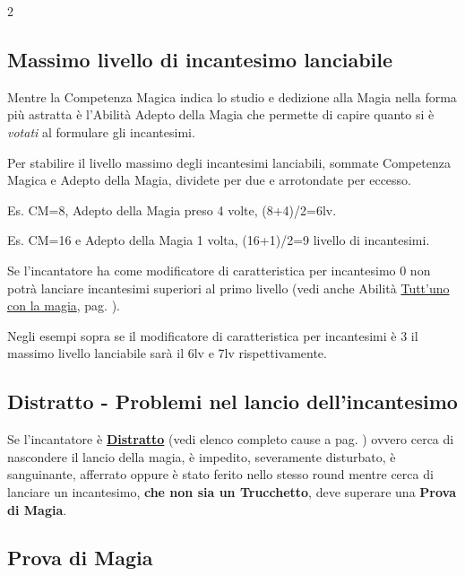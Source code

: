 \begin{multicols}{2}
\subsection{Massimo livello di incantesimo lanciabile}\hypertarget{scuoleelivelli}{}\label{magieaccessoallelistedimagia}\label{scuoleelivelli}

Mentre la Competenza Magica indica lo studio e dedizione alla Magia nella forma più astratta è l'Abilità Adepto della Magia che permette di capire quanto si è \emph{votati} al formulare gli incantesimi.

Per stabilire il livello massimo degli incantesimi lanciabili, sommate Competenza Magica e Adepto della Magia, dividete per due e arrotondate per eccesso.

Es. CM=8, Adepto della Magia preso 4 volte, (8+4)/2=6lv.

Es. CM=16 e Adepto della Magia 1 volta, (16+1)/2=9 livello di incantesimi.

Se l'incantatore ha come modificatore di caratteristica per incantesimo 0 non potrà lanciare incantesimi superiori al primo livello (vedi anche Abilità \hyperlink{Tutt'uno con la magia}{Tutt'uno con la magia}, pag. \pageref{Tutt'uno con la magia}).

Negli esempi sopra se il modificatore di caratteristica per incantesimi è 3 il massimo livello lanciabile sarà il 6lv e 7lv rispettivamente.

\subsection{Distratto - Problemi nel lancio dell'incantesimo}\label{magiedistratto}

Se l'incantatore è \hyperlink{defdistratto}{\textbf{Distratto}} (vedi elenco completo cause a pag. \pageref{defdistratto}) ovvero cerca di nascondere il lancio della magia, è impedito, severamente disturbato, è sanguinante, afferrato oppure è stato ferito nello stesso round mentre cerca di lanciare un incantesimo, \textbf{che non sia un Trucchetto}, deve superare una \textbf{Prova di Magia}.

\subsection{Prova di Magia}\label{magieprovadimagia}


\end{multicols}
